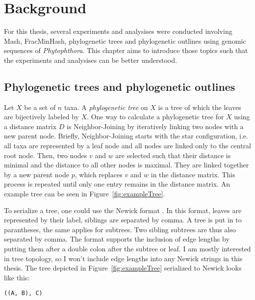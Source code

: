 
\chapter{Background}
  \label{sec:background}

For this thesis, several experiments and analysises were conducted involving
Mash, FracMinHash, phylogenetic trees and phylogenetic outlines using genomic
sequences of \textit{Phytophthora}. This chapter aims to introduce those topics
such that the experiments and analysises can be better understood.

\section{Phylogenetic trees and phylogenetic outlines}
Let $X$ be a set of $n$ taxa. A \textit{phylogenetic tree} on $X$ is a tree of
which the leaves are bijectively labeled by $X$. One way to calculate a
phylogenetic tree for $X$ using a distance matrix $D$ is Neighbor-Joining
\cite{saitouNeighborjoiningMethodNew1987} by iteratively linking two nodes with
a new parent node. Briefly, Neighbor-Joining starts with the star configuration,
i.e. all taxa are represented by a leaf node and all nodes are linked only to
the central root node. Then, two nodes $v$ and $w$ are selected such that their
distance is minimal and the distance to all other nodes is maximal. They are
linked together by a new parent node $p$, which replaces $v$ and $w$ in the
distance matrix. This process is repeated until only one entry remains in the
distance matrix. An example tree can be seen in Figure~\ref{fig:exampleTree}.

To serialize a tree, one could use the Newick format
\cite{pavlopoulosReferenceGuideTree2010}. In this format, leaves are represented
by their label, siblings are separated by comma. A tree is put in to
parantheses, the same applies for subtrees. Two sibling subtrees are thus also
separated by comma. The format supports the inclusion of edge lengths by putting
them after a double colon after the subtree or leaf. I am mostly interested in
tree topology, so I won't include edge lengths into any Newick strings in this
thesis. The tree depicted in Figure~\ref{fig:exampleTree} serialized to Newick
looks like this:

\texttt{((A, B), C)}

